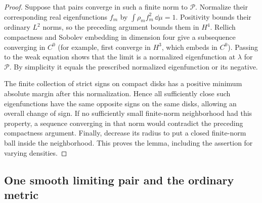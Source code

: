 \begin{proof}
Suppose that pairs converge in such a finite norm to $\mathcal P$.
Normalize their corresponding real eigenfunctions $f_m$ by
$\int\rho_m f_m^2\,\dd\mu=1$. Positivity bounds their ordinary
$L^2$ norms, so the preceding argument bounds them in $H^4$.
Rellich compactness and Sobolev embedding in dimension four give
a subsequence converging in $C^0$ (for example, first converge in
$H^3$, which embeds in $C^0$). Passing to the weak equation shows
that the limit is a normalized eigenfunction at $\lambda$ for
$\mathcal P$. By simplicity it equals the prescribed normalized
eigenfunction or its negative.

The finite collection of strict signs on compact disks has a
positive minimum absolute margin after this normalization. Hence
all sufficiently close such eigenfunctions have the same opposite
signs on the same disks, allowing an overall change of sign. If
no sufficiently small finite-norm neighborhood had this property,
a sequence converging in that norm would contradict the preceding
compactness argument. Finally, decrease its radius to put a closed
finite-norm ball inside the neighborhood. This proves the lemma,
including the assertion for varying densities.
\end{proof}

\subsection{One smooth limiting pair and the ordinary metric}

